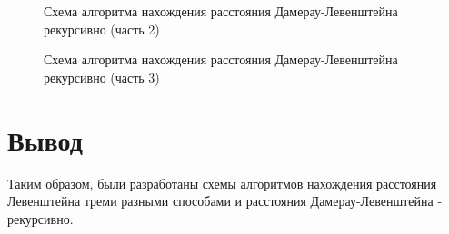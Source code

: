 \begin{figure}[p]
	\caption{Схема алгоритма нахождения расстояния Дамерау-Левенштейна рекурсивно (часть 2)}
	\label{img_dam_2}
\end{figure}
\begin{figure}[p]
	\caption{Схема алгоритма нахождения расстояния Дамерау-Левенштейна рекурсивно (часть 3)}
	\label{img_dam_3}
\end{figure}
\newpage

\section{Вывод}
Таким образом, были разработаны схемы алгоритмов нахождения расстояния Левенштейна треми разными способами и расстояния Дамерау-Левенштейна - рекурсивно.

